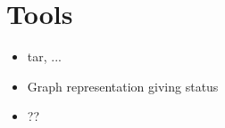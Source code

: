 \section{Tools}
\label{sec:tools}
\begin{itemize}
\item tar, ...
\item Graph representation giving status
\item ??
\end{itemize}
